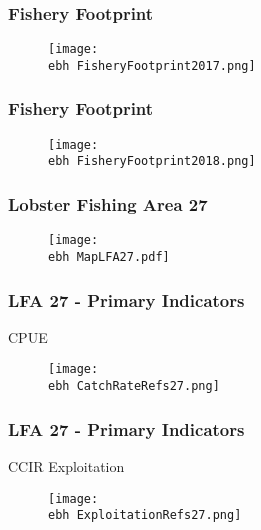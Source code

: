 \documentclass{beamer}
\newcommand{\ebh}{\string~/bio.data/bio.lobster/figures/Assessment/LFA2732/} %
\begin{document}
\begin{frame}
\frametitle{Fishery Footprint}
\begin{figure}
        \begin{center}
            \texttt{[image: \\ebh FisheryFootprint2017.png]}
        \end{center}
    \end{figure}
\end{frame}




\begin{frame}
\frametitle{Fishery Footprint}
\begin{figure}
        \begin{center}
            \texttt{[image: \\ebh FisheryFootprint2018.png]}
        \end{center}
    \end{figure}
\end{frame}







\begin{frame}
\frametitle{Lobster Fishing Area 27}
\begin{figure}
        \begin{center}
            \texttt{[image: \\ebh MapLFA27.pdf]}
        \end{center}
    \end{figure}
\end{frame}


\begin{frame}
\frametitle{LFA 27 - Primary Indicators}
CPUE
\begin{figure}
        \begin{center}
            \texttt{[image: \\ebh CatchRateRefs27.png]}
        \end{center}
    \end{figure}
\end{frame}



\begin{frame}
\frametitle{LFA 27 - Primary Indicators}
CCIR Exploitation 
\begin{figure}
        \begin{center}
            \texttt{[image: \\ebh ExploitationRefs27.png]}
        \end{center}
    \end{figure}
\end{frame}
\end{document}
